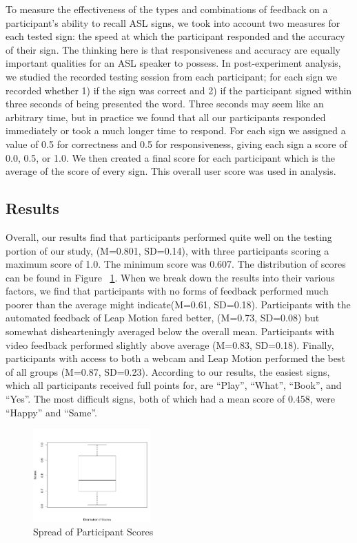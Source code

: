 \documentclass{sigchi}
\begin{document}
To measure the effectiveness of the types and combinations of feedback on a participant’s ability to recall ASL signs, we took into account two measures for each tested sign: the speed at which the participant responded and the accuracy of their sign.  The thinking here is that responsiveness and accuracy are equally important qualities for an ASL speaker to possess.  In post-experiment analysis, we studied the recorded testing session from each participant; for each sign we recorded whether 1) if the sign was correct and 2) if the participant signed within three seconds of being presented the word.  Three seconds may seem like an arbitrary time, but in practice we found that all our participants responded immediately or took a much longer time to respond.  For each sign we assigned a value of 0.5 for correctness and 0.5 for responsiveness, giving each sign a score of 0.0, 0.5, or 1.0.  We then created a final score for each participant which is the average of the score of every sign.  This overall user score was used in analysis.  

\subsection{Results}
Overall, our results find that participants performed quite well on the testing portion of our study, (M=0.801, SD=0.14), with three participants scoring a maximum score of 1.0.  The minimum score was 0.607.  The distribution of scores can be found in Figure ~\ref{boxplot}.  When we break down the results into their various factors, we find that participants with no forms of feedback performed much poorer than the average might indicate(M=0.61, SD=0.18).  Participants with the automated feedback of Leap Motion fared better, (M=0.73,  SD=0.08) but somewhat dishearteningly averaged below the overall mean.  Participants with video feedback performed slightly above average (M=0.83, SD=0.18).  Finally, participants with access to both a webcam and Leap Motion performed the best of all groups (M=0.87, SD=0.23).  According to our results, the easiest signs, which all participants received full points for, are ``Play'', ``What'', ``Book'', and ``Yes''.  The most difficult signs, both of which had a mean score of 0.458, were ``Happy'' and ``Same''.  



\begin{figure}
\centering
\includegraphics[width=0.4\textwidth]{boxplot.png}
\caption{Spread of Participant Scores}
\label{boxplot}
\end{figure}
\end{document}

